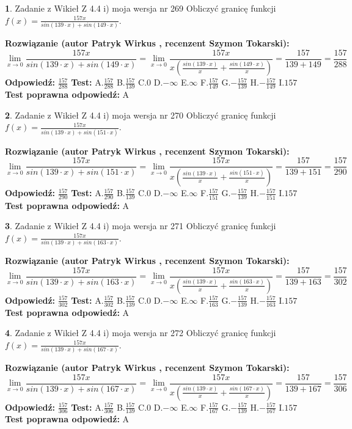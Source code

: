 \documentclass[12pt, a4paper]{article}
\theoremstyle{definition} %
\newtheorem{zad}{}
\newcommand{\zadStart}[1]{\begin{zad}#1\newline}
\newcommand{\zadStop}{\end{zad}}
\newcommand{\rozwStart}[2]{\noindent \textbf{Rozwiązanie (autor #1 , recenzent #2): }\newline}
\newcommand{\rozwStop}{\newline}
\newcommand{\odpStart}{\noindent \textbf{Odpowiedź:}\newline}
\newcommand{\odpStop}{\newline}
\newcommand{\testStart}{\noindent \textbf{Test:}\newline}
\newcommand{\testStop}{\newline}
\newcommand{\kluczStart}{\noindent \textbf{Test poprawna odpowiedź:}\newline}
\newcommand{\kluczStop}{\newline}
\begin{document}
\zadStart{Zadanie z Wikieł Z 4.4 i) moja wersja nr 269}
Obliczyć granicę funkcji $f(x)=\frac{157x}{sin(139\cdot x) +sin(149\cdot x)}$.
\zadStop
\rozwStart{Patryk Wirkus}{Szymon Tokarski}
$$\lim\limits_{x\to 0}\frac{157x}{sin(139\cdot x) +sin(149\cdot x)}=\lim\limits_{x\to 0}\frac{157x}{x(\frac{sin(139\cdot x)}{x}+\frac{sin(149\cdot x)}{x})}=\frac{157}{139+149} = \frac{157}{288}$$
\rozwStop
\odpStart
$\frac{157}{288}$
\odpStop
\testStart
A.$\frac{157}{288}$
B.$\frac{157}{139}$
C.$0$
D.$-\infty$
E.$\infty$
F.$\frac{157}{149}$
G.$-\frac{157}{139}$
H.$-\frac{157}{149}$
I.$157$
\testStop
\kluczStart
A
\kluczStop



\zadStart{Zadanie z Wikieł Z 4.4 i) moja wersja nr 270}
Obliczyć granicę funkcji $f(x)=\frac{157x}{sin(139\cdot x) +sin(151\cdot x)}$.
\zadStop
\rozwStart{Patryk Wirkus}{Szymon Tokarski}
$$\lim\limits_{x\to 0}\frac{157x}{sin(139\cdot x) +sin(151\cdot x)}=\lim\limits_{x\to 0}\frac{157x}{x(\frac{sin(139\cdot x)}{x}+\frac{sin(151\cdot x)}{x})}=\frac{157}{139+151} = \frac{157}{290}$$
\rozwStop
\odpStart
$\frac{157}{290}$
\odpStop
\testStart
A.$\frac{157}{290}$
B.$\frac{157}{139}$
C.$0$
D.$-\infty$
E.$\infty$
F.$\frac{157}{151}$
G.$-\frac{157}{139}$
H.$-\frac{157}{151}$
I.$157$
\testStop
\kluczStart
A
\kluczStop



\zadStart{Zadanie z Wikieł Z 4.4 i) moja wersja nr 271}
Obliczyć granicę funkcji $f(x)=\frac{157x}{sin(139\cdot x) +sin(163\cdot x)}$.
\zadStop
\rozwStart{Patryk Wirkus}{Szymon Tokarski}
$$\lim\limits_{x\to 0}\frac{157x}{sin(139\cdot x) +sin(163\cdot x)}=\lim\limits_{x\to 0}\frac{157x}{x(\frac{sin(139\cdot x)}{x}+\frac{sin(163\cdot x)}{x})}=\frac{157}{139+163} = \frac{157}{302}$$
\rozwStop
\odpStart
$\frac{157}{302}$
\odpStop
\testStart
A.$\frac{157}{302}$
B.$\frac{157}{139}$
C.$0$
D.$-\infty$
E.$\infty$
F.$\frac{157}{163}$
G.$-\frac{157}{139}$
H.$-\frac{157}{163}$
I.$157$
\testStop
\kluczStart
A
\kluczStop



\zadStart{Zadanie z Wikieł Z 4.4 i) moja wersja nr 272}
Obliczyć granicę funkcji $f(x)=\frac{157x}{sin(139\cdot x) +sin(167\cdot x)}$.
\zadStop
\rozwStart{Patryk Wirkus}{Szymon Tokarski}
$$\lim\limits_{x\to 0}\frac{157x}{sin(139\cdot x) +sin(167\cdot x)}=\lim\limits_{x\to 0}\frac{157x}{x(\frac{sin(139\cdot x)}{x}+\frac{sin(167\cdot x)}{x})}=\frac{157}{139+167} = \frac{157}{306}$$
\rozwStop
\odpStart
$\frac{157}{306}$
\odpStop
\testStart
A.$\frac{157}{306}$
B.$\frac{157}{139}$
C.$0$
D.$-\infty$
E.$\infty$
F.$\frac{157}{167}$
G.$-\frac{157}{139}$
H.$-\frac{157}{167}$
I.$157$
\testStop
\kluczStart
A
\kluczStop
\end{document}
